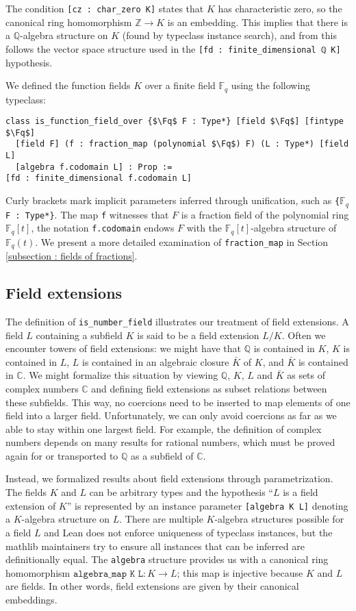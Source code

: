 \documentclass[a4paper,USenglish,cleveref, autoref, thm-restate]{lipics-v2021}
\newcommand{\C}{\mathbb{C}}
\newcommand{\lean}[1]{\texttt{#1}\xspace} %
\newcommand*{\Fq}[1][q]{\mathbb{F}_{#1}}
\newcommand{\mathlib}{\textsf{mathlib}\xspace}
\newcommand{\Q}{\mathbb{Q}}
\newcommand{\Z}{\mathbb{Z}}
\begin{document}
The condition \lean{[cz : char\_zero K]} states that $K$ has characteristic zero, so the canonical ring homomorphism $\Z \to K$ is an embedding.
This implies that there is a $\Q$-algebra structure on $K$ (found by typeclass instance search),
and from this follows the vector space structure used in the \lean{[fd : finite\_dimensional ℚ K]} hypothesis.

We defined the function fields $K$ over a finite field $\Fq$ using the following typeclass:
\begin{lstlisting}
class is_function_field_over {$\Fq$ F : Type*} [field $\Fq$] [fintype $\Fq$]
  [field F] (f : fraction_map (polynomial $\Fq$) F) (L : Type*) [field L]
  [algebra f.codomain L] : Prop :=
[fd : finite_dimensional f.codomain L]
\end{lstlisting}
Curly brackets mark implicit parameters inferred through unification, such as \lean{\{$\Fq$ F : Type*\}}.
The map \lean{f} witnesses that $F$ is a fraction field of the polynomial ring $\Fq[q][t]$,
the notation \lean{f.codomain} endows $F$ with the $\Fq[q][t]$-algebra structure of $\Fq(t)$. We present a more detailed examination of \lean{fraction\_map} in Section \ref{subsection : fields of fractions}.

\subsection{Field extensions}

The definition of \lean{is\_number\_field} illustrates our treatment of field extensions.
A field $L$ containing a subfield $K$ is said to be a field extension $L / K$.
Often we encounter towers of field extensions: we might have that $\Q$ is contained in $K$, $K$ is contained in $L$, $L$ is contained in an algebraic closure $\bar{K}$ of $K$, and $\bar{K}$ is contained in $\C$.
We might formalize this situation by viewing $\Q$, $K$, $L$ and $\bar{K}$ as sets of complex numbers $\C$ and defining field extensions as subset relations between these subfields.
This way, no coercions need to be inserted to map elements of one field into a larger field.
Unfortunately, we can only avoid coercions as far as we able to stay within one largest field.
For example, the definition of complex numbers depends on many results for rational numbers, which must be proved again for or transported to $\Q$ as a subfield of $\C$.

Instead, we formalized results about field extensions through parametrization. The fields $K$ and $L$ can be arbitrary types
and the hypothesis ``$L$ is a field extension of $K$'' is represented by an instance parameter \lean{[algebra K L]} denoting a $K$-algebra structure on $L$.
There are multiple $K$-algebra structures possible for a field $L$ and Lean does not enforce uniqueness of typeclass instances,
but the \mathlib maintainers try to ensure all instances that can be inferred are definitionally equal.
The \lean{algebra} structure provides us with a canonical ring homomorphism $\lean{algebra\_map K L} : K \to L$; this map is injective because $K$ and $L$ are fields.
In other words, field extensions are given by their canonical embeddings.
\end{document}
